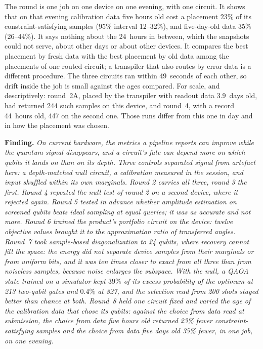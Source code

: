 \documentclass[11pt,a4paper]{article}
\newcommand{\finding}[1]{\par\smallskip\noindent\textbf{Finding.} \emph{#1}\par\smallskip}
\begin{document}
The round is one job on one device on one evening, with one circuit. It
shows that on that evening calibration data five hours old cost a placement
23\% of its constraint-satisfying samples (95\% interval 12--32\%), and
five-day-old data 35\% (26--44\%). It says nothing about the 24~hours in between, which the snapshots
could not serve, about other days or about other devices. It compares the
best placement by fresh data with the best placement by old data among the
placements of one routed circuit; a transpiler that also routes by error
data is a different procedure. The three circuits ran within 49~seconds of
each other, so drift inside the job is small against the ages compared.
For scale, and descriptively: round~2A, placed by the transpiler with
readout data $3.9$~days old, had returned 244 such samples on this device,
and round~4, with a record 44~hours old, 447 on the second one. Those runs
differ from this one in day and in how the placement was chosen.

\finding{On current hardware, the metrics a pipeline reports can improve
while the quantum signal disappears, and a circuit's fate can depend more on
which qubits it lands on than on its depth. Three controls separated signal
from artefact here: a depth-matched null circuit, a calibration measured in
the session, and input shuffled within its own marginals. Round 2 carries
all three, round 3 the first. Round 4 repeated the null test of round 2 on
a second device, where it rejected again. Round 5 tested in advance whether
amplitude estimation on screened qubits beats ideal sampling at equal
queries; it was as accurate and not more. Round 6 trained the product's
portfolio circuit on the device: twelve objective values brought it to the
approximation ratio of transferred angles. Round~7 took sample-based
diagonalization to 24 qubits, where recovery cannot fill the space: the
energy did not separate device samples from their marginals or from uniform
bits, and it was ten times closer to exact from all three than from
noiseless samples, because noise enlarges the subspace. With the null, a QAOA state
trained on a simulator
kept $39\%$ of its excess probability of the optimum at 213 two-qubit gates
and $0.4\%$ at 827, and the selection read from 200 shots stayed better than
chance at both. Round~8 held one circuit fixed and varied the age of the
calibration data that chose its qubits: against the choice from data read
at submission, the choice from data five hours old returned 23\% fewer
constraint-satisfying samples and the choice from data five days old 35\%
fewer, in one job, on one evening.}
\end{document}
